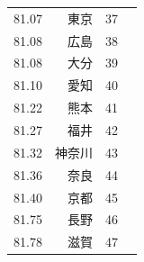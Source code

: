 \begin{table}[ht]
\begin{tabular}{rrlr}
 81.07 & 東京 &  37 \\
 81.08 & 広島 &  38 \\
 81.08 & 大分 &  39 \\
 81.10 & 愛知 &  40 \\
 81.22 & 熊本 &  41 \\
 81.27 & 福井 &  42 \\
 81.32 & 神奈川 &  43 \\
 81.36 & 奈良 &  44 \\
 81.40 & 京都 &  45 \\
 81.75 & 長野 &  46 \\
 81.78 & 滋賀 &  47 \\
   \hline
\end{tabular}
\end{table}








